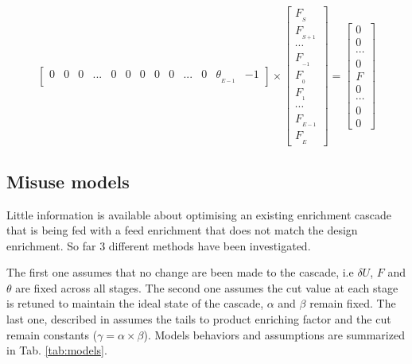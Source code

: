 \begin{equation}
\begin{bmatrix}
 0           & 0                 & 0                 & ...  & 0            & 0            & 0             & 0             & 0             & ... & 0               & \theta_{_{E-1}} & -1
 \end{bmatrix}
 \times
 \begin{bmatrix}
     F_{_{S}}   \\
     F_{_{S+1}} \\
     \cdots     \\
     F_{_{-1}}  \\
     F_{_{0} }  \\
     F_{_{1} }  \\
     \cdots     \\
     F_{_{E-1}} \\
     F_{_{E}}
 \end{bmatrix}
 =
 \begin{bmatrix}
     0      \\
     0      \\
     \cdots \\
     0      \\
     F      \\
     0      \\
     \cdots \\
     0      \\
     0
\end{bmatrix}
\label{eq_flow}
\end{equation}



\subsection{Misuse models}

Little information is available about optimising an existing enrichment cascade
that is being fed with a feed enrichment that does not match the design
enrichment. So far 3 different methods have been investigated.

The first one assumes that no change are been made to the cascade, i.e $\delta
U$, $F$ and $\theta$ are fixed across all stages. The second one assumes the cut
value at each stage is retuned to maintain the ideal state of the cascade,
$\alpha$ and $\beta$ remain fixed. The last one, described in \cite{walker.2017}
assumes the tails to product enriching factor and the cut remain constants ($\gamma =
\alpha\times\beta$). Models behaviors and assumptions are summarized in Tab.
\ref{tab:models}.

